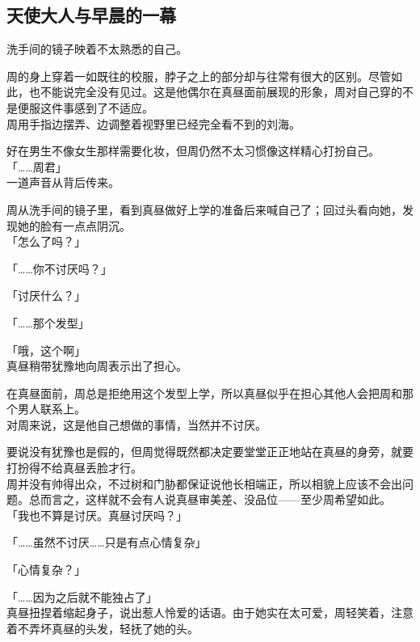 \subsection{天使大人与早晨的一幕}

洗手间的镜子映着不太熟悉的自己。

周的身上穿着一如既往的校服，脖子之上的部分却与往常有很大的区别。尽管如此，也不能说完全没有见过。这是他偶尔在真昼面前展现的形象，周对自己穿的不是便服这件事感到了不适应。\\

周用手指边摆弄、边调整着视野里已经完全看不到的刘海。

好在男生不像女生那样需要化妆，但周仍然不太习惯像这样精心打扮自己。\\

「……周君」\\

一道声音从背后传来。

周从洗手间的镜子里，看到真昼做好上学的准备后来喊自己了；回过头看向她，发现她的脸有一点点阴沉。\\

「怎么了吗？」

「……你不讨厌吗？」

「讨厌什么？」

「……那个发型」

「哦，这个啊」\\

真昼稍带犹豫地向周表示出了担心。

在真昼面前，周总是拒绝用这个发型上学，所以真昼似乎在担心其他人会把周和那个男人联系上。\\

对周来说，这是他自己想做的事情，当然并不讨厌。

要说没有犹豫也是假的，但周觉得既然都决定要堂堂正正地站在真昼的身旁，就要打扮得不给真昼丢脸才行。\\

周并没有帅得出众，不过树和门胁都保证说他长相端正，所以相貌上应该不会出问题。总而言之，这样就不会有人说真昼审美差、没品位——至少周希望如此。\\

「我也不算是讨厌。真昼讨厌吗？」

「……虽然不讨厌……只是有点心情复杂」

「心情复杂？」

「……因为之后就不能独占了」\\

真昼扭捏着缩起身子，说出惹人怜爱的话语。由于她实在太可爱，周轻笑着，注意着不弄坏真昼的头发，轻抚了她的头。\\

